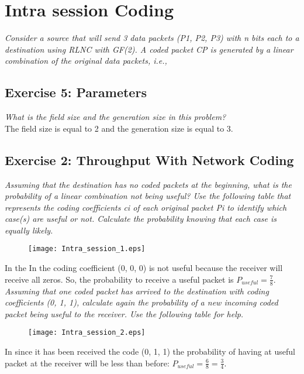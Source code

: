\section{Intra session Coding}
\textit{Consider a source that will send 3 data packets (P1, P2, P3) with n bits each to a destination using RLNC with GF(2). A coded packet CP is generated by a linear combination of the original data packets, i.e.,}

\subsection{Exercise 5: Parameters }
\textit{What is the field size and the generation size in this problem?}\\
The field size is equal to 2 and the generation size is equal to 3. 

\subsection{Exercise 2: Throughput With Network Coding}
\textit{Assuming that the destination has no coded packets at the beginning, what is the probability of a linear combination not being useful? Use the following table that represents the coding coefficients ci of each original packet Pi to identify which case(s) are useful or not. Calculate the probability knowing that each case is equally likely.}\\
\begin{figure}[!h]
  \centering
  \texttt{[image: Intra\_session\_1.eps]}
  \caption{}
  \label{fig:Intra_session_1}
\end{figure}
In the In  the coding coefficient (0, 0, 0) is not useful because the receiver will receive all zeros. So, the probability to receive a useful packet is $P_{useful}=\frac{7}{8}$.\\

\textit{Assuming that one coded packet has arrived to the destination with coding coefficients (0, 1, 1), calculate again the probability of a new incoming coded packet being useful to the receiver. Use the following table for help.}\begin{figure}[!h]
  \centering
  \texttt{[image: Intra\_session\_2.eps]}
  \caption{}
  \label{fig:Intra_session_2}
\end{figure}

In  since it has been received the code (0, 1, 1) the probability of having at useful packet at the receiver will be less than before: $P_{useful}=\frac{6}{8}=\frac{3}{4}$.\\

